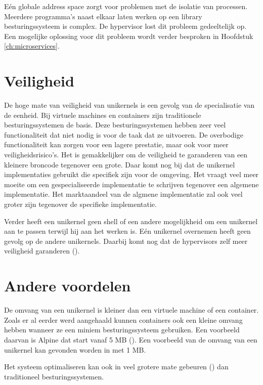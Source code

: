 \documentclass[pdftex,a4paper,12pt,twoside]{report}
\begin{document}
Eén globale address space zorgt voor problemen met de isolatie van processen. Meerdere programma's naast elkaar laten werken op een library besturingssysteem is complex. De hypervisor lost dit probleem gedeeltelijk op. Een mogelijke oplossing voor dit probleem wordt verder besproken in Hoofdstuk \ref{ch:microservices}.

\section{Veiligheid}

De hoge mate van veiligheid van unikernels is een gevolg van de specialisatie van de eenheid. Bij virtuele machines en containers zijn traditionele besturingssystemen de basis. Deze besturingssystemen hebben zeer veel functionaliteit dat niet nodig is voor de taak dat ze uitvoeren. De overbodige functionaliteit kan zorgen voor een lagere prestatie, maar ook voor meer veiligheidsrisico's. Het is gemakkelijker om de veiligheid te garanderen van een kleinere broncode tegenover een grote. Daar komt nog bij dat de unikernel implementaties gebruikt die specifiek zijn voor de omgeving. Het vraagt veel meer moeite om een gespecialiseerde implementatie te schrijven tegenover een algemene implementatie. Het marktaandeel van de algmene implementatie zal ook veel groter zijn tegenover de specifieke implementatie.

Verder heeft een unikernel geen shell of een andere mogelijkheid om een unikernel aan te passen terwijl hij aan het werken is. Eén unikernel overnemen heeft geen gevolg op de andere unikernels. Daarbij komt nog dat de hypervisors zelf meer veiligheid garanderen (\cite{colp_breaking_2011}).

\section{Andere voordelen}
\label{sec:bene_unikernels}

De omvang van een unikernel is kleiner dan een virtuele machine of een container. Zoals er al eerder werd aangehaald kunnen containers ook een kleine omvang hebben wanneer ze een miniem besturingssysteem gebruiken. Een voorbeeld daarvan is Alpine dat start vanaf 5 MB (\cite{_gliderlabs/docker-alpine_????}).
Een voorbeeld van de omvang van een unikernel kan gevonden worden in \cite[hoofdstuk 4, p.~10]{madhavapeddy_jitsu:_2015} met 1 MB.

Het systeem optimaliseren kan ook in veel grotere mate gebeuren (\cite{madhavapeddy_turning_2010}) dan traditioneel besturingssystemen.
\end{document}
